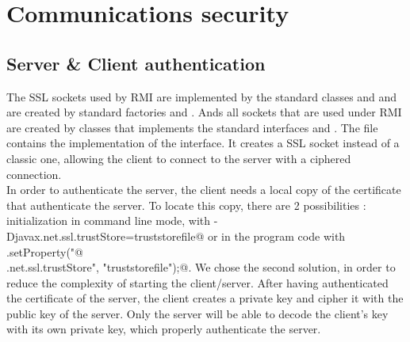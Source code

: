 \documentclass{article}
\begin{document}
\newpage


\section{Communications security}
\subsection{Server \& Client authentication}
The SSL sockets used by RMI are implemented by the standard classes \verb@SSLSocket@ and \verb@SSLSocketServer@ and are created by standard factories \verb@SSLSocketFactory@ and \verb@SSLSocketServerFactory@. Ands all sockets that are used under RMI are created by classes that implements the standard interfaces \verb@RMIClientSocketFactory@ and \verb@RMIServerSocketFactory@. The file \verb@RMISSLClientSocketFactory@ contains the implementation of the \verb@RMIClientSocketFactory@ interface. It creates a SSL socket instead of a classic one, allowing the client to connect to the server with a ciphered connection. \\

In order to authenticate the server, the client needs a local copy of the certificate that authenticate the server. To locate this copy, there are 2 possibilities : initialization in command line mode, with \verb@-Djavax.net.ssl.trustStore=truststorefile@ or in the program code with \verb@System.setProperty("@\\\verb@javax.net.ssl.trustStore", "truststorefile");@. We chose the second solution, in order to reduce the complexity of starting the client/server. After having authenticated the certificate of the server, the client creates a private key and cipher it with the public key of the server. Only the server will be able to decode the client's key with its own private key, which properly authenticate the server.\\
\end{document}
